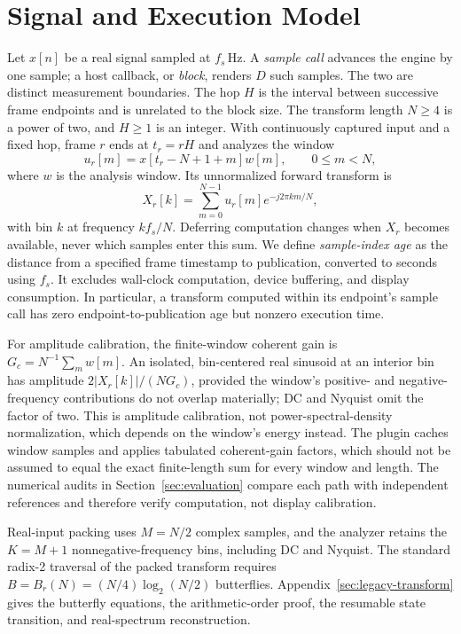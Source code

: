 \section{Signal and Execution Model}
\label{sec:signal-model}
Let $x[n]$ be a real signal sampled at $f_s$\,Hz. A \emph{sample call}
advances the engine by one sample; a host callback, or \emph{block}, renders
$D$ such samples. The two are distinct measurement boundaries. The hop $H$ is
the interval between successive frame endpoints and is unrelated to the block
size. The transform length $N\ge4$ is a power of two, and $H\ge1$ is an
integer. With continuously captured input and a fixed hop, frame $r$ ends at
$t_r=rH$ and analyzes the window
\begin{equation}
 u_r[m]=x[t_r-N+1+m]w[m],\qquad 0\le m<N,
\end{equation}
where $w$ is the analysis window. Its unnormalized forward transform is
\begin{equation}
 X_r[k]=\sum_{m=0}^{N-1}u_r[m]e^{-j2\pi km/N},
 \label{eq:dft}
\end{equation}
with bin $k$ at frequency $kf_s/N$. Deferring computation changes when $X_r$
becomes available, never which samples enter this sum. We define
\emph{sample-index age} as the distance from a specified frame timestamp to
publication, converted to seconds using $f_s$. It excludes wall-clock
computation, device buffering, and display consumption. In particular, a
transform computed within its endpoint's sample call has zero
endpoint-to-publication age but nonzero execution time.

For amplitude calibration, the finite-window coherent gain is
$G_c=N^{-1}\sum_m w[m]$. An isolated, bin-centered real sinusoid at an
interior bin has amplitude $2|X_r[k]|/(NG_c)$, provided the window's
positive- and negative-frequency contributions do not overlap materially; DC
and Nyquist omit the factor of two. This is amplitude calibration, not
power-spectral-density normalization, which depends on the window's energy
instead. The plugin caches window samples and applies tabulated
coherent-gain factors, which should not be assumed to equal the exact
finite-length sum for every window and length. The numerical audits in
Section~\ref{sec:evaluation} compare each path with independent references
and therefore verify computation, not display calibration.

Real-input packing uses $M=N/2$ complex samples, and the analyzer retains the
$K=M+1$ nonnegative-frequency bins, including DC and Nyquist. The standard
radix-2 traversal of the packed transform requires
$B=B_r(N)=(N/4)\log_2(N/2)$ butterflies. Appendix~\ref{sec:legacy-transform}
gives the butterfly equations, the arithmetic-order proof, the resumable
state transition, and real-spectrum reconstruction.

